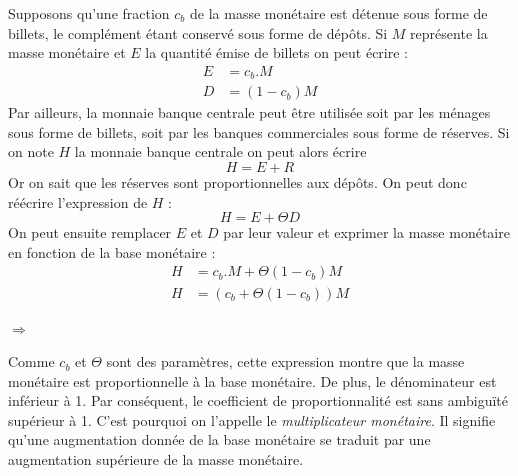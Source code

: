 \documentclass[10pt]{book}
\begin{document}
Supposons qu'une fraction $c_b$ de la masse monétaire est détenue sous forme de billets, le complément étant conservé sous forme de dépôts. Si $M$ représente la masse monétaire et $E$ la quantité émise de billets on peut écrire : 
\begin{align*}
  E & = c_b.M \\
  D & = (1 - c_b)M
\end{align*}
Par ailleurs, la monnaie banque centrale peut être utilisée soit par les ménages sous forme de billets, soit par les banques commerciales sous forme de réserves. Si on note $H$ la monnaie banque centrale on peut alors écrire
$$ H = E + R$$
Or on sait que les réserves sont proportionnelles aux dépôts. On peut donc réécrire l'expression de $H$ :
$$ H = E + \Theta D $$
On peut ensuite remplacer $E$ et $D$ par leur valeur et exprimer la masse monétaire en fonction de la base monétaire : 
\begin{align*}
  H & = c_b.M + \Theta (1 - c_b)M \\
  H & = (c_b + \Theta (1 - c_b))M 
\end{align*}
  \begin{center}
    $\Rightarrow$  
  \end{center}
Comme $c_b$ et $\Theta$ sont des paramètres, cette expression montre que la masse monétaire est proportionnelle à la base monétaire. De plus, le dénominateur est inférieur à 1. Par conséquent, le coefficient de proportionnalité est sans ambiguïté supérieur à 1. C'est pourquoi on l'appelle le \textit{multiplicateur monétaire}. Il signifie qu'une augmentation donnée de la base monétaire se traduit par une augmentation supérieure de la masse monétaire.
\end{document}
